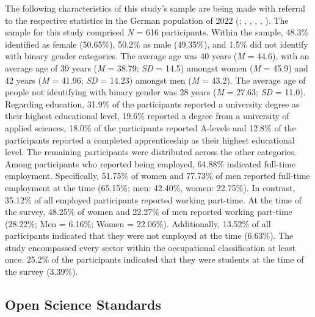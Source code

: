 \documentclass[
  12pt,
  a4paper,
  twoside]{article}
\begin{document}
The following characteristics of this study's sample are being made with referral to the respective statistics in the German population of 2022 (; , , , , ).
The sample for this study comprised \emph{N} = 616 participants. Within the sample, 48.3\% identified as female (50.65\%), 50.2\% as male (49.35\%), and 1.5\% did not identify with binary gender categories. The average age was 40 years (\emph{M} = 44.6), with an average age of 39 years (\emph{M} = 38.79; \emph{SD} = 14.5) amongst women (\emph{M} = 45.9) and 42 years (\emph{M} = 41.96; \emph{SD} = 14.23) amongst men (\emph{M} = 43.2). The average age of people not identifying with binary gender was 28 years (\emph{M} = 27.63; \emph{SD} = 11.0).
Regarding education, 31.9\% of the participants reported a university degree as their highest educational level, 19.6\% reported a degree from a university of applied sciences, 18.0\% of the participants reported A-levels and 12.8\% of the participants reported a completed apprenticeship as their highest educational level. The remaining participants were distributed across the other categories.
Among participants who reported being employed, 64.88\% indicated full-time employment.
Specifically, 51.75\% of women and 77.73\% of men reported full-time employment at the time (65.15\%; men: 42.40\%, women: 22.75\%).
In contrast, 35.12\% of all employed participants reported working part-time.
At the time of the survey, 48.25\% of women and 22.27\% of men reported working part-time (28.22\%; Men = 6.16\%; Women = 22.06\%).
Additionally, 13.52\% of all participants indicated that they were not employed at the time (6.63\%).
The study encompassed every sector within the occupational classification at least once. 25.2\% of the participants indicated that they were students at the time of the survey (3.39\%).

\subsection{Open Science Standards}\label{open-science-standards}
\end{document}
